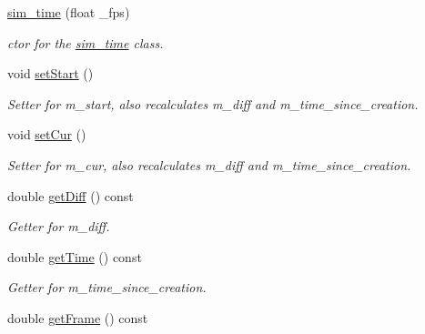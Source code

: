 \begin{DoxyCompactItemize}
\item 
\hyperlink{classsim__time_a42885957f994feacfe3ae4246875be6a}{sim\-\_\-time} (float \-\_\-fps)
\begin{DoxyCompactList}\small\item\em ctor for the \hyperlink{classsim__time}{sim\-\_\-time} class. \end{DoxyCompactList}\item 
\hypertarget{classsim__time_ae4e4e0ec9b08c69ed694fc55af087d8f}{void \hyperlink{classsim__time_ae4e4e0ec9b08c69ed694fc55af087d8f}{set\-Start} ()}\label{classsim__time_ae4e4e0ec9b08c69ed694fc55af087d8f}

\begin{DoxyCompactList}\small\item\em Setter for m\-\_\-start, also recalculates m\-\_\-diff and m\-\_\-time\-\_\-since\-\_\-creation. \end{DoxyCompactList}\item 
\hypertarget{classsim__time_a53ec26919841cbb2eb4aeca2b4839e95}{void \hyperlink{classsim__time_a53ec26919841cbb2eb4aeca2b4839e95}{set\-Cur} ()}\label{classsim__time_a53ec26919841cbb2eb4aeca2b4839e95}

\begin{DoxyCompactList}\small\item\em Setter for m\-\_\-cur, also recalculates m\-\_\-diff and m\-\_\-time\-\_\-since\-\_\-creation. \end{DoxyCompactList}\item 
\hypertarget{classsim__time_a3dfeae677bf25cc05120a70d03c0e1f2}{double \hyperlink{classsim__time_a3dfeae677bf25cc05120a70d03c0e1f2}{get\-Diff} () const }\label{classsim__time_a3dfeae677bf25cc05120a70d03c0e1f2}

\begin{DoxyCompactList}\small\item\em Getter for m\-\_\-diff. \end{DoxyCompactList}\item 
\hypertarget{classsim__time_af2a38a2f13c8f49d2b2f1185e5e6f185}{double \hyperlink{classsim__time_af2a38a2f13c8f49d2b2f1185e5e6f185}{get\-Time} () const }\label{classsim__time_af2a38a2f13c8f49d2b2f1185e5e6f185}

\begin{DoxyCompactList}\small\item\em Getter for m\-\_\-time\-\_\-since\-\_\-creation. \end{DoxyCompactList}\item 
\hypertarget{classsim__time_a98cee05c12e80d66458df3d1ac98b0b7}{double \hyperlink{classsim__time_a98cee05c12e80d66458df3d1ac98b0b7}{get\-Frame} () const }\label{classsim__time_a98cee05c12e80d66458df3d1ac98b0b7}


\end{DoxyCompactItemize}
